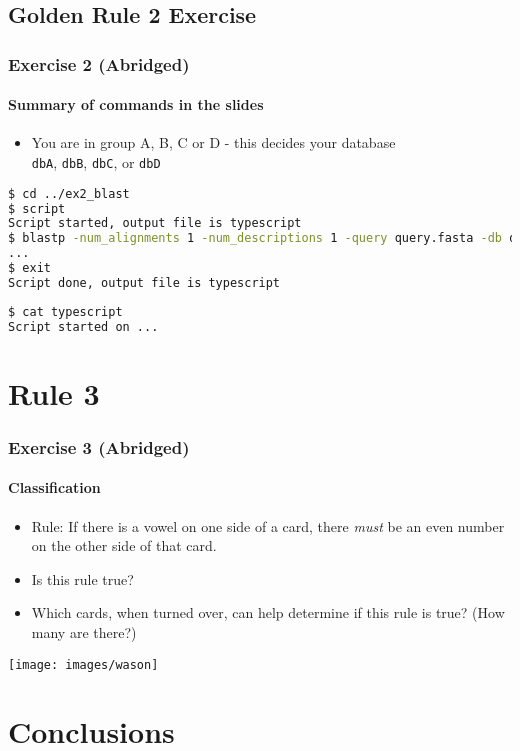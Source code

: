 \subsection{Golden Rule 2 Exercise}
\begin{frame}[fragile]
  \frametitle{Exercise 2 (Abridged)}
  \framesubtitle{Summary of commands in the slides}
  \begin{itemize}
    \item You are in group A, B, C or D - this decides your database\\
    \texttt{dbA}, \texttt{dbB}, \texttt{dbC}, or \texttt{dbD}
  \end{itemize}
\begin{lstlisting}[language=bash]
$ cd ../ex2_blast
$ script
Script started, output file is typescript
$ blastp -num_alignments 1 -num_descriptions 1 -query query.fasta -db dbA
...
$ exit
Script done, output file is typescript
\end{lstlisting}
\begin{lstlisting}[language=bash]
$ cat typescript
Script started on ...
\end{lstlisting}
\end{frame}

    

\section{Rule 3}
%
\begin{frame}
  \frametitle{Exercise 3 (Abridged)}
  \framesubtitle{Classification}
  \begin{itemize}
    \item Rule: If there is a vowel on one side of a card, there \textit{must} be an even number on the other side of that card.
    \item Is this rule true?
    \item Which cards, when turned over, can help determine if this rule is true? (How many are there?)
  \end{itemize}
  \texttt{[image: images/wason]}
\end{frame}

    

\section{Conclusions}
    

